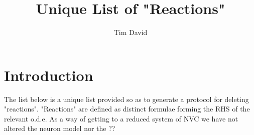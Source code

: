 \documentclass[]{article}
\title{Unique List of "Reactions" }
\author{Tim David }
\begin{document}
\maketitle
\listoftodos
\begin{abstract}

\end{abstract}

\section{Introduction}
The list below is a unique list provided so as to generate a protocol for deleting "reactions". "Reactions" are defined as distinct formulae forming the RHS of the relevant o.d.e. 
As a way of getting to a reduced system of NVC we have  not altered the neuron model nor the ?? 
\end{document}
